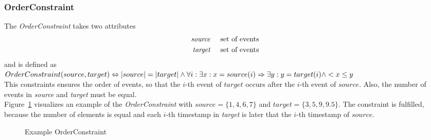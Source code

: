 	\subsubsection{OrderConstraint}
		The \emph{OrderConstraint} takes two attributes
		\begin{align*}
			\emph{source} & \hspace{.5cm}\text{set of events}\\
			\emph{target} & \hspace{.5cm}\text{set of events}
		\end{align*}
		and is defined as\\[10pt]
		\begin{math}
			OrderConstraint ( source, target )\\
			\Leftrightarrow|source| = |target| \land \forall i:\exists x: x=source(i)\Rightarrow \exists y: y=target(i)\land < x \leq y
		\end{math}\\[10pt]
		This constraints ensures the order of events, so that the $i$-th event of $target$ occurs after the $i$-th event of $source$. Also, the number of events in \emph{source} and \emph{target} must be equal.\\
		Figure~\ref{fig:OrderConstraintExample} visualizes an example of the \emph{OrderConstraint} with $source = \{1, 4, 6, 7\}$ and $target = \{3, 5, 9, 9.5\}$. The constraint is fulfilled, because the number of elements is equal and each $i$-th timestamp in \emph{target} is later that the $i$-th timestamp of $source$.
		\begin{figure}
			\caption{Example OrderConstraint}
			\label{fig:OrderConstraintExample}
		\end{figure}
		
